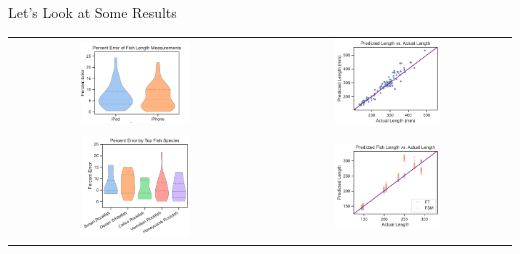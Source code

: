 \begin{frame}{Let's Look at Some Results}
    \centering
    \begin{tabular}{cc}
        \includegraphics[width=0.45\textwidth]{images/device_error.pdf} &
        \includegraphics[width=0.45\textwidth]{images/fsm_all_scatter.pdf} \\
        \includegraphics[width=0.45\textwidth]{images/top_species_error.pdf} &
        \includegraphics[width=0.45\textwidth]{images/fsm_ft_scatter.pdf} \\
    \end{tabular}
\end{frame}

